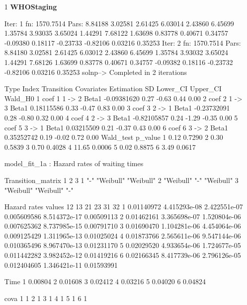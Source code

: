 \documentclass[11pt,a4paper]{article}
\begin{document}
\begin{enumerate}
  \item[1] \textbf{WHOStaging}
\begin{Schunk}
\begin{Soutput}
Iter: 1 fn: 1570.7514	 Pars:   8.84188  3.02581  2.61425  6.03014  2.43860  6.45699  1.35784  3.93035  3.65024  1.44291  7.68122  1.63698  0.83778  0.40671  0.34757 -0.09380  0.18117 -0.23733 -0.82106  0.03216  0.35253
Iter: 2 fn: 1570.7514	 Pars:   8.84180  3.02581  2.61425  6.03012  2.43860  6.45699  1.35784  3.93032  3.65024  1.44291  7.68126  1.63699  0.83778  0.40671  0.34757 -0.09382  0.18116 -0.23732 -0.82106  0.03216  0.35253
solnp--> Completed in 2 iterations
\end{Soutput}
\begin{Soutput}
  Type Index Transition Covariates  Estimation   SD Lower_CI Upper_CI Wald_H0
1 coef     1     1 -> 2      Beta1 -0.09381620 0.27    -0.63     0.44    0.00
2 coef     2     1 -> 3      Beta1  0.18115586 0.33    -0.47     0.83    0.00
3 coef     3     2 -> 1      Beta1 -0.23732091 0.28    -0.80     0.32    0.00
4 coef     4     2 -> 3      Beta1 -0.82105857 0.24    -1.29    -0.35    0.00
5 coef     5     3 -> 1      Beta1  0.03215509 0.21    -0.37     0.43    0.00
6 coef     6     3 -> 2      Beta1  0.35252742 0.19    -0.02     0.72    0.00
  Wald_test p_value
1      0.12  0.7290
2      0.30  0.5839
3      0.70  0.4028
4     11.65  0.0006
5      0.02  0.8875
6      3.49  0.0617
\end{Soutput}
\begin{Soutput}
model_fit_1a  : Hazard rates of waiting times

Transition_matrix
  1         2         3        
1 "-"       "Weibull" "Weibull"
2 "Weibull" "-"       "Weibull"
3 "Weibull" "Weibull" "-"      

Hazard rates values 
          12           13           21          23           31         32
1 0.01140972 4.415293e-08 2.422551e-07 0.005609586 8.514372e-17 0.00509113
2 0.01462161 3.365698e-07 1.520804e-06 0.007625362 8.737985e-15 0.00791710
3 0.01690470 1.104281e-06 4.454064e-06 0.009125429 1.311965e-13 0.01025024
4 0.01873766 2.565611e-06 9.547144e-06 0.010365496 8.967470e-13 0.01231170
5 0.02029520 4.933654e-06 1.724677e-05 0.011442282 3.982452e-12 0.01419216
6 0.02166345 8.417739e-06 2.796126e-05 0.012404605 1.346421e-11 0.01593991

     Time
1 0.00804
2 0.01608
3 0.02412
4 0.03216
5 0.04020
6 0.04824

  cova
1    1
2    1
3    1
4    1
5    1
6    1


\end{Soutput}
\end{Schunk}
\end{enumerate}
\end{document}
